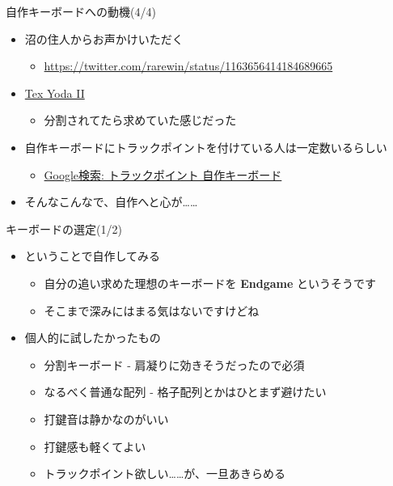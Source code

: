 \documentclass[cjk,dvipdfmx,10pt,compress,fragile%
hyperref={bookmarks=true,bookmarksnumbered=true,bookmarksopen=false,%
colorlinks=false,%
pdftitle={第 134 回 関西 Debian 勉強会},%
pdfauthor={小林},%
pdfsubject={資料},%
}]{beamer}
\begin{document}
\begin{frame}[fragile,t]{自作キーボードへの動機(4/4)}
 \begin{itemize}
  \item 沼の住人からお声かけいただく
	\begin{itemize}
	 \item \url{https://twitter.com/rarewin/status/1163656414184689665}
	\end{itemize}
  \item \href{https://mechanicalkeyboards.com/shop/index.php?l=product_detail&p=3532}{Tex Yoda II}
	\begin{itemize}
	 \item 分割されてたら求めていた感じだった
	\end{itemize}
  \item 自作キーボードにトラックポイントを付けている人は一定数いるらしい
	\begin{itemize}
	 \item \href{https://www.google.com/search?client=firefox-b-e&q=%E3%83%88%E3%83%A9%E3%83%83%E3%82%AF%E3%83%9D%E3%82%A4%E3%83%B3%E3%83%88+%E8%87%AA%E4%BD%9C%E3%82%AD%E3%83%BC%E3%83%9C%E3%83%BC%E3%83%89}{Google検索: トラックポイント 自作キーボード}
	\end{itemize}
  \item そんなこんなで、自作へと心が……
 \end{itemize}
\end{frame}

\begin{frame}[fragile,t]{キーボードの選定(1/2)}
 \begin{itemize}
  \item ということで自作してみる
	\begin{itemize}
	 \item 自分の追い求めた理想のキーボードを \textbf{Endgame} というそうです
	 \item そこまで深みにはまる気はないですけどね
	\end{itemize}
  \item 個人的に試したかったもの
	\begin{itemize}
	 \item 分割キーボード - 肩凝りに効きそうだったので必須
	 \item なるべく普通な配列 - 格子配列とかはひとまず避けたい
	 \item 打鍵音は静かなのがいい
	 \item 打鍵感も軽くてよい
	 \item トラックポイント欲しい……が、一旦あきらめる
	\end{itemize}
 \end{itemize}
\end{frame}
\end{document}
